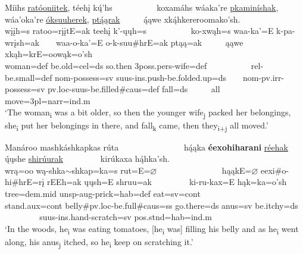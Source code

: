 \begin{exe}
\begin{xlist}
        \item\label{Ch5ExSameSubjectSCC} \glll Míihs \uline{ratóoniitek}, téehį kų́'hs ~ ~ ~ ~ ~ ~ koxamáhs wáaka're \uline{pkaminíshak}, ~ ~ wáa'oka're \uline{óksuuherek}, \uline{ptą́ąrak} ~ ~ ~ ą́ąwe xką́hkereroomako'sh.\\
        wįįh=s ratoo=rįįtE=ak teehį k'-ųųh=s ~ ~ ~ ~ ~ ~ ko-xwąh=s waa-ka'=E k-pa-wrįsh=ak ~ ~ waa-o-ka'=E o-k-suu\#hrE=ak ptąą=ak ~ ~ ~ ąąwe xkąh=krE=oowąk=o'sh\\
        \textnormal{woman}=def \textnormal{be.old}=cel=ds \textnormal{so.then} 3poss.pers-\textnormal{wife}=def ~ ~ ~ ~ ~ ~ rel-\textnormal{be.small}=def nom-\textnormal{possess}=sv suus-ins.push-\textnormal{be.folded.up}=ds ~ ~ nom-pv.irr-\textnormal{possess}=sv pv.loc-suus-\textnormal{be.filled}\#caus=def \textnormal{fall}=ds ~ ~ ~ \textnormal{all} \textnormal{move}=3pl=narr=ind.m\\
        \glt `The woman\textsubscript{i} was a bit older, so then the younger wife\textsubscript{j} packed her belongings, she\textsubscript{i} put her belongings in there, and fall\textsubscript{k} came, then they\textsubscript{i+j} all moved.' \citep[13]{trechter2012b}
        



        \item\label{Ch5ExSameSubjectSRD} \glll Manároo mashkáshkapkas rúta ~ ~ ~ ~ ~ ~ ~ ~ ~  hą́ąka \textbf{éexohiharani} \uline{réehak} ų́ųshe \uline{shirúurak} ~ ~ ~ ~ ~ kirúkaxa hą́hka'sh.\\
        wrą=oo wą-shka$\sim$shkap=ka=s rut=E=$\varnothing$ ~ ~ ~ ~ ~ ~ ~ ~ ~ hąąkE=$\varnothing$ eexi\#o-hi\#hrE=rį rEEh=ak ųųsh=E shruu=ak ~ ~ ~ ~ ~ ki-ru-kax=E hąk=ka=o'sh\\
        \textnormal{tree}=dem.mid unsp-aug-\textnormal{prick}=hab=def \textnormal{eat}=sv=cont ~ ~ ~ ~ ~ ~ ~ ~ ~ \textnormal{stand}.aux=cont \textnormal{belly}\#pv.loc-\textnormal{be.full}\#caus=ss \textnormal{go.there}=ds \textnormal{anus}=sv \textnormal{be.itchy}=ds ~ ~ ~ ~ ~ suus-ins.hand-\textnormal{scratch}=sv pos.stnd=hab=ind.m\\
        \glt `In the woods, he\textsubscript{i} was eating tomatoes, [he\textsubscript{i} was] filling his belly and as he\textsubscript{i} went along, his anus\textsubscript{j} itched, so he\textsubscript{i} keep on scratching it.' \citep[14]{hollow1973a}


\end{xlist}
\end{exe}
